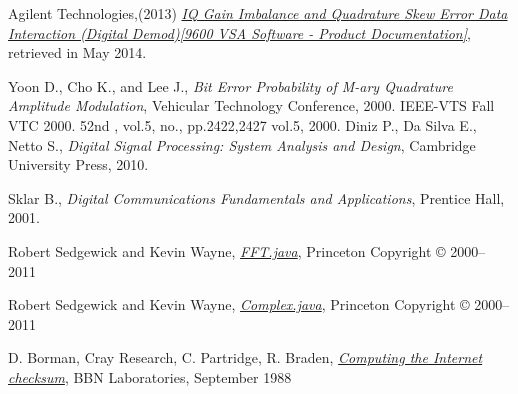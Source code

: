 \documentclass[12pt,a4paper,openright]{report}
\begin{document}
\begin{thebibliography}{1}
Agilent Technologies,(2013) \href{http://wireless.agilent.com/wireless/helpfiles/89600B/WebHelp/subsystems/digdemod/content/digdemod_para_interact_iqgainimb_quadskewerr.htm}{\emph{IQ Gain Imbalance and Quadrature Skew Error Data Interaction (Digital Demod)[9600 VSA Software - Product Documentation]}}, retrieved in May 2014.

Yoon D., Cho K., and Lee J., \emph{Bit Error Probability of M-ary Quadrature Amplitude Modulation}, Vehicular Technology Conference, 2000. IEEE-VTS Fall VTC 2000. 52nd , vol.5, no., pp.2422,2427 vol.5, 2000.
Diniz P., Da Silva E., Netto S., \emph{Digital Signal Processing: System Analysis and Design}, Cambridge University Press, 2010.

Sklar B., \emph{Digital Communications Fundamentals and Applications}, Prentice Hall, 2001.


Robert Sedgewick and Kevin Wayne,
\href{http://introcs.cs.princeton.edu/java/97data/FFT.java.html}{\emph{FFT.java}},  Princeton
Copyright © 2000–2011

Robert Sedgewick and Kevin Wayne,
\href{http://introcs.cs.princeton.edu/java/97data/Complex.java.html}{\emph{Complex.java}},  Princeton
Copyright © 2000–2011

D.  Borman, 
Cray Research, 
C. Partridge, 
R.  Braden, 
\href{http://introcs.cs.princeton.edu/java/97data/Complex.java.html}{\emph{Computing the Internet checksum}}, BBN Laboratories, 
September 1988








\end{thebibliography}
\end{document}
